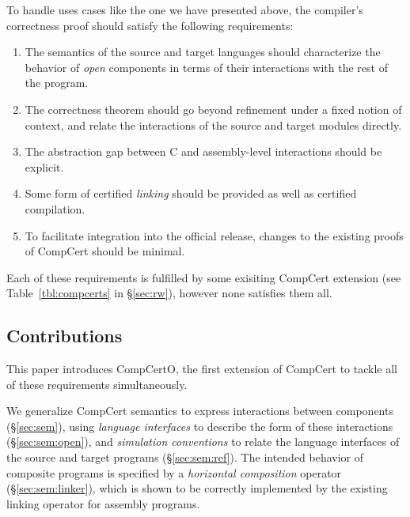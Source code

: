 \documentclass[acmsmall,authordraft]{acmart}
\begin{document}
To handle uses cases like the one we have presented above,
the compiler's correctness proof
should satisfy the following requirements:
\begin{enumerate}
\item \label{req:opensem}
  The semantics of the source and target languages
  should characterize the behavior of \emph{open} components
  in terms of their interactions with the rest of the program.
\item \label{req:opensim}
  The correctness theorem
  should go beyond refinement under a fixed notion of context, and relate
  the interactions of the source and target modules directly.
\item \label{req:openabs}
  The abstraction gap between C and assembly-level
  interactions should be explicit.
\item \label{req:linking}
  Some form of certified \emph{linking}
  should be provided as well as certified compilation.
\item \label{req:complexity}
  To facilitate integration into the official release,
  changes to the existing proofs of CompCert
  should be minimal.
\end{enumerate}
Each of these requirements is fulfilled
by some exisiting CompCert extension
(see Table~\ref{tbl:compcerts} in \S\ref{sec:rw}),
however none satisfies them all.



\subsection{Contributions} %

This paper introduces CompCertO,
the first extension of CompCert to tackle
all of these requirements simultaneously.

We generalize CompCert semantics
to express interactions between components (\S\ref{sec:sem}),
using \emph{language interfaces}
to describe the form of these interactions (\S\ref{sec:sem:open}),
and \emph{simulation conventions}
to relate the language interfaces
of the source and target programs (\S\ref{sec:sem:ref}).
The intended behavior of
composite programs is specified by a
\emph{horizontal composition} operator (\S\ref{sec:sem:linker}),
which is shown to be correctly implemented
by the existing linking operator for assembly programs.
\end{document}

